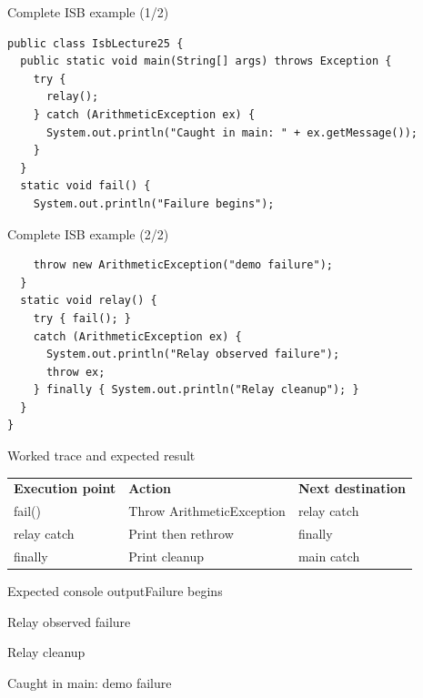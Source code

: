 \documentclass[10pt,aspectratio=169]{beamer}
\begin{document}
\begin{frame}[fragile,t]{Complete ISB example (1/2)}
\begin{lstlisting}
public class IsbLecture25 {
  public static void main(String[] args) throws Exception {
    try {
      relay();
    } catch (ArithmeticException ex) {
      System.out.println("Caught in main: " + ex.getMessage());
    }
  }
  static void fail() {
    System.out.println("Failure begins");
\end{lstlisting}
\end{frame}

\begin{frame}[fragile,t]{Complete ISB example (2/2)}
\begin{lstlisting}
    throw new ArithmeticException("demo failure");
  }
  static void relay() {
    try { fail(); }
    catch (ArithmeticException ex) {
      System.out.println("Relay observed failure");
      throw ex;
    } finally { System.out.println("Relay cleanup"); }
  }
}
\end{lstlisting}
\end{frame}

\begin{frame}[fragile,t]{Worked trace and expected result}
\small\renewcommand{\arraystretch}{1.4}
\begin{tabularx}{\textwidth}{>{\raggedright\arraybackslash}X>{\raggedright\arraybackslash}X>{\raggedright\arraybackslash}X}\rowcolor{navy}
\color{white}\bfseries Execution point & \color{white}\bfseries Action & \color{white}\bfseries Next destination\\
fail() & Throw Arithmetic\allowbreak Exception & relay catch\\
relay catch & Print then rethrow & finally\\
finally & Print cleanup & main catch\\
\end{tabularx}\par\vspace{2mm}
\begin{block}{Expected console output}\ttfamily\footnotesize Failure begins\par Relay observed failure\par Relay cleanup\par Caught in main: demo failure\end{block}
\end{frame}
\end{document}
